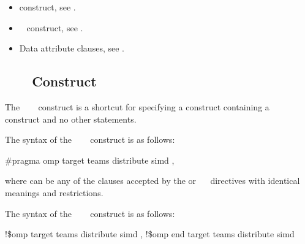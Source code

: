 \crossreferences
\begin{itemize}
\item {} construct, see 
.

\item {}~ construct, see 
.

\item Data attribute clauses, see 
.
\end{itemize}










\subsection{~~~ Construct}
\label{subsec:target teams distribute simd construct}
\summary
The ~~~ construct is a shortcut for specifying a  construct 
containing a ~~ construct and no other statements.

\syntax
\ccppspecificstart
The syntax of the ~~~ construct is as follows:

\begin{boxedcode}
\#pragma omp target teams distribute simd \plc{[clause[ [},\plc{] clause] ... ]}
\end{boxedcode}

where  can be any of the clauses accepted by the  or 
~~ directives with identical meanings and restrictions.
\ccppspecificend

\fortranspecificstart
The syntax of the ~~~ construct is as follows:

\begin{boxedcode}
!\$omp target teams distribute simd \plc{[clause[ [},\plc{] clause] ... ]}
\plc{[}!\$omp end target teams distribute simd\plc{]}
\end{boxedcode}

